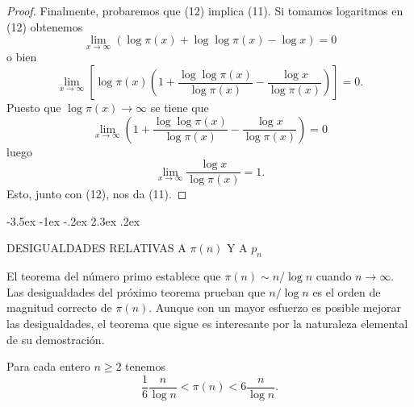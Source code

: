 \documentclass[12pt,a4paper]{book}
\makeatletter
\renewcommand\section{\@startsection{section}{1}{\z@}%
  {-3.5ex \@plus -1ex \@minus -.2ex}%
  {2.3ex \@plus .2ex}%
  {\normalfont\Large\bfseries\raggedright}}
\makeatother
\begin{document}
\begin{proof}
        Finalmente, probaremos que (12) implica (11). Si tomamos logaritmos en (12)
        obtenemos
        \begin{equation*}
            \lim_{x\to\infty}(\log\pi(x)+\log\log\pi(x)-\log x)=0
        \end{equation*}
        o bien
        \begin{equation*}
            \lim_{x\to\infty}\left[\log\pi(x)\left(1+\frac{\log\log\pi(x)}{\log\pi(x)}
            -\frac{\log x}{\log\pi(x)}\right)\right]=0.
        \end{equation*}
        Puesto que $\log\pi(x)\to\infty$ se tiene que
        \begin{equation*}
            \lim_{x\to\infty}\left(1+\frac{\log\log\pi(x)}{\log\pi(x)}-\frac{\log x}{\log\pi(x)}\right)=0
        \end{equation*}
        luego
        \begin{equation*}
            \lim_{x\to\infty}\frac{\log x}{\log\pi(x)}=1.
        \end{equation*}
        Esto, junto con (12), nos da (11).
    \end{proof}

    \section{DESIGUALDADES RELATIVAS A \texorpdfstring{$\pi(n)$}{π(n)} Y A \texorpdfstring{$p_{n}$}{pn}}

    El teorema del número primo establece que $\pi(n)\sim n/\log n$ cuando
    $n\to\infty$. Las desigualdades del próximo teorema prueban que $n/\log n$ es el
    orden de magnitud correcto de $\pi(n)$. Aunque con un mayor esfuerzo es posible
    mejorar las desigualdades, el teorema que sigue es interesante por la naturaleza
    elemental de su demostración.

    \begin{teorema}
        Para cada entero $n\geq2$ tenemos
        \begin{equation}
            \frac{1}{6}\frac{n}{\log n}<\pi(n)<6\frac{n}{\log n}.
        \end{equation}
    \end{teorema}
\end{document}
